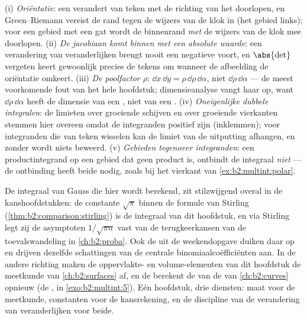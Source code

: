 \begin{remark}
(i) \emph{Oriëntatie}: een  verandert van teken met de
richting van het doorlopen, en Green--Riemann vereist de rand tegen
de wijzers van de klok in (het gebied links); voor een gebied met
een gat wordt de binnenrand \emph{met} de wijzers van de klok mee
doorlopen. (ii) \emph{De jacobiaan komt binnen met een absolute
waarde}: een verandering van veranderlijken brengt nooit een
negatieve  voort, en $\abs{\det}$ vergeten keert
gewoonlijk precies de tekens om wanneer de afbeelding de oriëntatie
omkeert. (iii) \emph{De poolfactor $\rho$}: $\dd x\,\dd y =
\rho\,\dd\rho\,\dd\alpha$, niet $\dd\rho\,\dd\alpha$ --- de meest
voorkomende fout van het hele hoofdstuk; dimensieanalyse vangt haar
op, want $\dd\rho\,\dd\alpha$ heeft de dimensie van een , niet
van een . (iv) \emph{Oneigenlijke dubbele integralen}:
de limieten over groeiende schijven en over groeiende vierkanten
stemmen hier overeen omdat de integranden positief zijn (inklemmen);
voor integranden die van teken wisselen kan de limiet van de
uitputting afhangen, en zonder  wordt niets
beweerd. (v) \emph{Gebieden tegenover integranden}: een
productintegrand op een gebied dat geen product is, ontbindt de
integraal \emph{niet} --- de ontbinding heeft beide nodig, zoals bij
het vierkant van \cref{ex:b2:multint:polar}.
\end{remark}

\begin{remark}
De integraal van Gauss die hier wordt berekend, zit stilzwijgend
overal in de kanshoofdstukken: de constante $\sqrt\pi$ binnen de
formule van Stirling (\cref{thm:b2:comparison:stirling}) is de
integraal van dit hoofdstuk, en via Stirling legt zij de asymptoten
$1/\sqrt{\pi n}$ vast van de terugkeerkansen van de toevalswandeling
in \cref{ch:b2:proba}. Ook de  uit de
weekendopgave duiken daar op en drijven dezelfde schattingen van de
centrale binomiaalcoëfficiënten aan. In de andere richting maken de
oppervlakte- en volume-elementen van dit hoofdstuk de meetkunde van
\cref{ch:b2:surfaces} af, en de  berekent de
 van de  van \cref{ch:b2:curves} opnieuw (de
, in \cref{exo:b2:multint:5}). Eén hoofdstuk, drie
diensten: maat voor de meetkunde, constanten voor de kansrekening,
en de discipline van de verandering van veranderlijken voor beide.
\end{remark}

